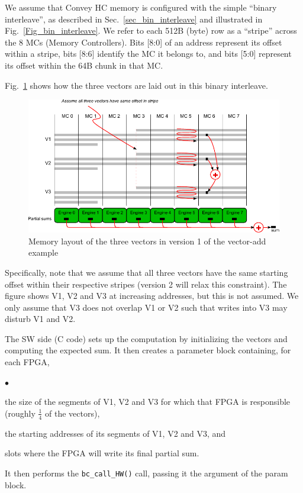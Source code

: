 \documentclass[twoside,letterpaper,11pt]{article}
\newenvironment{tightlist}%
{\begin{list}{$\bullet$}{%
    \setlength{\topsep}{0in}
    \setlength{\partopsep}{0in}
    \setlength{\itemsep}{0in}
    \setlength{\parsep}{0in}
    \setlength{\leftmargin}{1.5em}
    \setlength{\rightmargin}{0in}
    \setlength{\itemindent}{0in}
}
}%
{\end{list}
}
\begin{document}
\label{sec_vadd_v0}

We assume that Convey HC memory is configured with the simple ``binary
interleave'', as described in Sec.~\ref{sec_bin_interleave} and
illustrated in Fig.~\ref{Fig_bin_interleave}.  We refer to each 512B
(byte) row as a ``stripe'' across the 8 MCs (Memory Controllers).
Bits [8:0] of an address represent its offset within a stripe, bits
[8:6] identify the MC it belongs to, and bits [5:0] represent its
offset within the 64B chunk in that MC.

Fig.~\ref{Fig_vadd_mem_layout} shows how the three vectors are laid
out in this binary interleave.
\begin{figure}[htbp]
  \centerline{\includegraphics[angle=0]{Figures/Fig_vadd_mem_layout}}
  \caption{\label{Fig_vadd_mem_layout}Memory layout of the three
    vectors in version 1 of the vector-add example}
\end{figure}
Specifically, note that we assume that all three vectors have the same
starting offset within their respective stripes (version 2 will relax
this constraint).  The figure shows V1, V2 and V3 at increasing
addresses, but this is not assumed.  We only assume that V3 does not
overlap V1 or V2 such that writes into V3 may disturb V1 and V2.

The SW side (C code) sets up the computation by initializing the
vectors and computing the expected sum.  It then creates a parameter
block containing, for each FPGA,
\begin{tightlist}
\item the size of the segments of V1, V2 and V3 for which that FPGA is
  responsible (roughly $\frac{1}{4}$ of the vectors),
\item the starting addresses of its segments of V1, V2 and V3, and
\item slots where the FPGA will write its final partial sum.
\end{tightlist}
It then performs the \verb|bc_call_HW()|  call, passing it the
argument of the param block.
\end{document}
